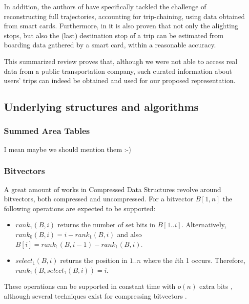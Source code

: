 \documentclass[runningheads]{llncs}
\begin{document}
In addition, the authors of \cite{tao2014exploring} have specifically tackled the challenge of reconstructing full trajectories, accounting for trip-chaining, using data obtained from smart cards. Furthermore, in \cite{alsger2016validating} it is also proven that not only the alighting stops, but also the (last) destination stop of a trip can be estimated from boarding data gathered by a smart card, within a reasonable accuracy.

This summarized review proves that, although we were not able to access real data from a public transportation company, such curated information about users' trips can indeed be obtained and used for our proposed representation.

\subsection{Underlying structures and algorithms}
\subsubsection{Summed Area Tables}
I mean maybe we should mention them :-)

\subsubsection{Bitvectors}
\label{sec:bit}
A great amount of works in Compressed Data Structures revolve around bitvectors, both compressed and uncompressed. For a bitvector $B[1,n]$ the following operations are expected to be supported:

\begin{itemize}
    \item $rank_1(B,i)$ returns the number of set bits in $B[1..i]$. Alternatively, $rank_0(B,i) = i - rank_1(B,i)$ and also $B[i] = rank_1(B,i-1) - rank_1(B,i)$.
    \item $select_1(B,i)$ returns the position in $1..n$ where the $i$th 1 occurs. Therefore, $rank_1(B,select_1(B,i)) = i$.
\end{itemize}

These operations can be supported in constant time with $o(n)$ extra bits \cite{Jac89,Mun96}, although several techniques exist for compressing bitvectors \cite{Raman:2002:SID:545381.545411,okanohara2007practical}. 
\end{document}
